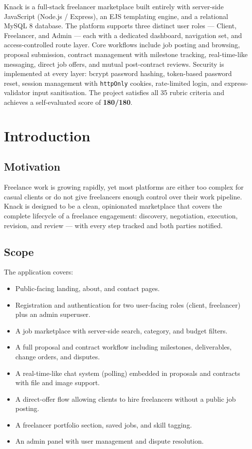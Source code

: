 \documentclass[12pt,a4paper]{article}
\begin{document}
Knack is a full-stack freelancer marketplace built entirely with server-side JavaScript (Node.js / Express), an EJS templating engine, and a relational MySQL 8 database. The platform supports three distinct user roles --- Client, Freelancer, and Admin --- each with a dedicated dashboard, navigation set, and access-controlled route layer. Core workflows include job posting and browsing, proposal submission, contract management with milestone tracking, real-time-like messaging, direct job offers, and mutual post-contract reviews. Security is implemented at every layer: bcrypt password hashing, token-based password reset, session management with \texttt{httpOnly} cookies, rate-limited login, and express-validator input sanitisation. The project satisfies all 35 rubric criteria and achieves a self-evaluated score of \textbf{180/180}.

\section{Introduction}

\subsection{Motivation}

Freelance work is growing rapidly, yet most platforms are either too complex for casual clients or do not give freelancers enough control over their work pipeline. Knack is designed to be a clean, opinionated marketplace that covers the complete lifecycle of a freelance engagement: discovery, negotiation, execution, revision, and review --- with every step tracked and both parties notified.

\subsection{Scope}

The application covers:
\begin{itemize}[noitemsep]
  \item Public-facing landing, about, and contact pages.
  \item Registration and authentication for two user-facing roles (client, freelancer) plus an admin superuser.
  \item A job marketplace with server-side search, category, and budget filters.
  \item A full proposal and contract workflow including milestones, deliverables, change orders, and disputes.
  \item A real-time-like chat system (polling) embedded in proposals and contracts with file and image support.
  \item A direct-offer flow allowing clients to hire freelancers without a public job posting.
  \item A freelancer portfolio section, saved jobs, and skill tagging.
  \item An admin panel with user management and dispute resolution.
\end{itemize}
\end{document}
